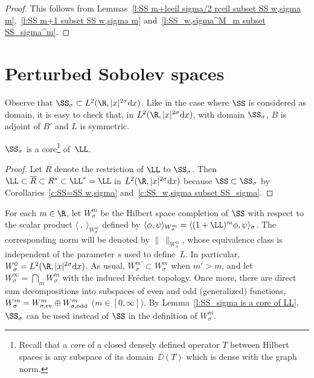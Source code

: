 \begin{proof}
  This follows from Lemmas~\ref{l:SS m+lceil sigma/2 rceil subset SS w,sigma m},~\ref{l:SS m+1 subset SS w,sigma m} and~\ref{l:SS_w,sigma^M_m subset SS_sigma^m}.
\end{proof}



\section{Perturbed Sobolev spaces}\label{s:W sigma m}

Observe that $\SS_\sigma\subset L^2(\R,|x|^{2\sigma}{\rm d}x)$. Like in the case where $\SS$ is considered as domain, it is easy to check that, in $L^2(\R,|x|^{2\sigma}{\rm d}x)$, with domain $\SS_\sigma$, $B$ is adjoint of $B'$ and $L$ is symmetric.

\begin{Lemma}\label{l:SS_sigma is a core of LL}
   $\SS_\sigma$ is a core\footnote{Recall that a {\em core\/} of a closed densely def\/ined operator $T$ between Hilbert spaces is any subspace of its domain~$\DD(T)$ which is dense with the graph norm.} of~$\LL$.
\end{Lemma}

\begin{proof}
  Let $R$ denote the restriction of $\LL$ to $\SS_\sigma$. Then $\LL\subset\overline{R}\subset R^*\subset\LL^*=\LL$ in $L^2(\R,|x|^{2\sigma}{\rm d}x)$ because $\SS\subset\SS_\sigma$ by Corollaries~\ref{c:SS=SS w,sigma} and~\ref{c:SS_w,sigma subset SS_sigma}.
\end{proof}

For each $m\in\R$, let $W_\sigma^m$ be the Hilbert space completion of $\SS$ with respect to the scalar product $\langle\ ,\ \rangle_{W_\sigma^m}$ def\/ined by $\langle\phi,\psi\rangle_{W_\sigma^m}=\langle(1+\LL)^m\phi,\psi\rangle_\sigma$. The corresponding norm will be denoted by $\|\ \|_{W_\sigma^m}$,
whose equivalence class is independent of the parameter $s$ used to def\/ine~$L$. In particular,
$W_\sigma^0=L^2(\R,|x|^{2\sigma}{\rm d}x)$. As usual, $W_\sigma^{m'}\subset
W_\sigma^m$ when $m'>m$,  and let
$W_\sigma^\infty=\bigcap_mW_\sigma^m$ with the
induced Fr\'echet topology. Once more, there are direct sum decompositions into subspaces of even and odd (generalized) functions, $W_\sigma^m=W_{\sigma,\text{\rm ev}}^m\oplus W_{\sigma,\text{\rm odd}}^m$ ($m\in[0,\infty]$). By Lemma~\ref{l:SS_sigma is a core of LL}, $\SS_\sigma$ can be used instead of $\SS$ in the def\/inition of $W_\sigma^m$.

